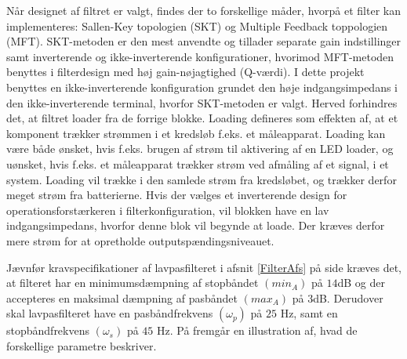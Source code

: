 Når designet af filtret er valgt, findes der to forskellige måder, hvorpå et filter kan implementeres: Sallen-Key topologien (SKT) og Multiple Feedback toppologien (MFT). SKT-metoden er den mest anvendte og tillader separate gain indstillinger samt inverterende og ikke-inverterende konfigurationer, hvorimod MFT-metoden benyttes i filterdesign med høj gain-nøjagtighed (Q-værdi). I dette projekt benyttes en ikke-inverterende konfiguration grundet den høje indgangsimpedans i den ikke-inverterende terminal, hvorfor SKT-metoden er valgt. Herved forhindres det, at filtret loader fra de forrige blokke. Loading defineres som effekten af, at et komponent trækker strømmen i et kredsløb f.eks. et måleapparat. Loading kan være både ønsket, hvis f.eks. brugen af strøm til aktivering af en LED loader, og uønsket, hvis f.eks. et måleapparat trækker strøm ved afmåling af et signal, i et system. Loading vil trække i den samlede strøm fra kredsløbet, og trækker derfor meget strøm fra batterierne. Hvis der vælges et inverterende design for operationsforstærkeren i filterkonfiguration, vil blokken have en lav indgangsimpedans, hvorfor denne blok vil begynde at loade. Der kræves derfor mere strøm for at opretholde outputspændingsniveauet. \cite{Webster2009,Carter2013,Karni2014}

Jævnfør kravspecifikationer af lavpasfilteret i afsnit \ref{FilterAfs} på side \pageref{FilterAfs} kræves det, at filteret har en minimumsdæmpning af stopbåndet $(min_{A})$ på $14$dB og der accepteres en maksimal dæmpning af pasbåndet $(max_{A})$ på $3$dB. Derudover skal lavpasfilteret have en pasbåndfrekvens $(\omega_p)$ på $25$ Hz, samt en stopbåndfrekvens $(\omega_s)$ på $45$ Hz. På  fremgår en illustration af, hvad de forskellige parametre beskriver.

